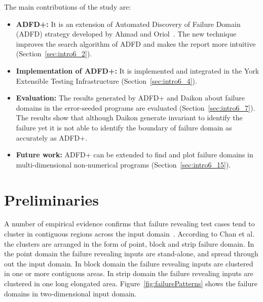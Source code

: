 The main contributions of the study are:
\begin{itemize}
\item \textbf{ADFD+:} It is an extension of Automated Discovery of Failure Domain (ADFD) strategy developed by Ahmad and Oriol~\cite{ahmad2013adfd}. The new technique improves the search algorithm of ADFD and makes the report more intuitive (Section~\ref{sec:intro6_2}).
\item \textbf{Implementation of ADFD+:} It is implemented and integrated in the York Extensible Testing Infrastructure (Section~\ref{sec:intro6_4}).
\item \textbf{Evaluation:} The results generated by ADFD+ and Daikon about failure domains in the error-seeded programs are evaluated (Section~\ref{sec:intro6_7}). The results show that although Daikon generate invariant to identify the failure yet it is not able to identify the boundary of failure domain as accurately as ADFD+. 
\item \textbf{Future work:} ADFD+ can be extended to find and plot failure domains in multi-dimensional non-numerical programs (Section~\ref{sec:intro6_15}).
\end{itemize}




\section{Preliminaries}\label{sec:intro6_1}
A number of empirical evidence confirms that failure revealing test cases tend to cluster in contiguous regions across the input domain~\cite{finelli1991nasa, schneckenburger2007towards, white1980domain}. According to Chan et al.~\cite{chan1996proportional} the clusters are arranged in the form of point, block and strip failure domain. In the point domain the failure revealing inputs are stand-alone, and spread through out the input domain. In block domain the failure revealing inputs are clustered in one or more contiguous areas. In strip domain the failure revealing inputs are clustered in one long elongated area.  Figure~\ref{fig:failurePatterns} shows the failure domains in two-dimensional input domain. 

